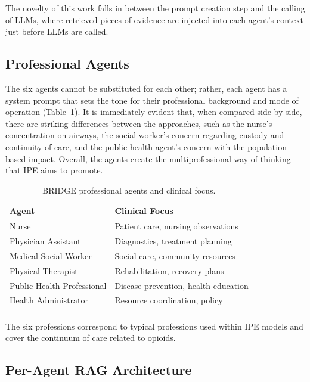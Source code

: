 \documentclass[pdflatex,sn-mathphys-num]{sn-jnl}
\theoremstyle{thmstyleone}
\theoremstyle{thmstyletwo}
\theoremstyle{thmstylethree}
\begin{document}
The novelty of this work falls in between the prompt creation step and the calling of LLMs, where retrieved pieces of evidence are injected into each agent’s context just before LLMs are called.

\subsection{Professional Agents}

The six agents cannot be substituted for each other; rather, each agent has a system
prompt that sets the tone for their professional background and mode of operation (Table~\ref{tab:agents}). It is immediately evident that, when compared side by side, there are striking differences between the approaches, such as the nurse’s concentration on airways,
the social worker’s concern regarding custody and continuity of care, and the public health agent’s concern with the population-based impact. Overall, the agents create the multiprofessional way of thinking that IPE aims to promote.

\begin{table}[h]
    \centering
    \caption{BRIDGE professional agents and clinical focus.}
    \label{tab:agents}
    \begin{tabular}{@{}ll@{}}
        \toprule
        \textbf{Agent} & \textbf{Clinical Focus} \\
        \midrule
        Nurse                      & Patient care, nursing observations \\
        Physician Assistant        & Diagnostics, treatment planning \\
        Medical Social Worker      & Social care, community resources \\
        Physical Therapist         & Rehabilitation, recovery plans \\
        Public Health Professional & Disease prevention, health education \\
        Health Administrator       & Resource coordination, policy \\
        \botrule
    \end{tabular}
\end{table}

The six professions correspond to typical professions used within IPE models \cite{reeves2016ipe} and cover the continuum of care related to opioids.

\subsection{Per-Agent RAG Architecture}
\end{document}
